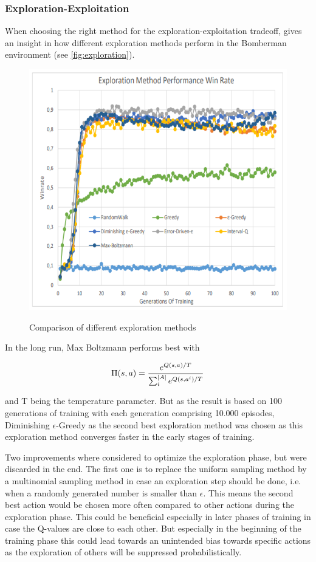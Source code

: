 \subsubsection{Exploration-Exploitation}
\label{ch:approachBa}

When choosing the right method for the exploration-exploitation tradeoff, \cite{Kormelink2018} gives an insight in how different exploration methods perform in the Bomberman environment (see \autoref{fig:exploration}). 

\begin{figure}[ht]
	\centering
	\includegraphics[width=0.6\linewidth]{figures/exploration.PNG}
	\caption{Comparison of different exploration methods}
	\label{fig:exploration}
	\cite{Kormelink2018}
\end{figure}

In the long run, Max Boltzmann performs best with 

\begin{equation}
	\Pi(s,a) = \frac{e^{Q(s,a)/T}}{\sum_i^{\lvert A\rvert}e^{Q(s,a^i)/T}}
\end{equation}

and T being the temperature parameter. But as the result is based on 100 generations of training with each generation comprising 10.000 episodes, Diminishing $\epsilon$-Greedy as the second best exploration method was chosen as this exploration method converges faster in the early stages of training.

Two improvements where considered to optimize the exploration phase, but were discarded in the end. The first one is to replace the uniform sampling method by a multinomial sampling method in case an exploration step should be done, i.e. when a randomly generated number is smaller than $\epsilon$. This means the second best action would be chosen more often compared to other actions during the exploration phase. This could be beneficial especially in later phases of training in case the Q-values are close to each other. But especially in the beginning of the training phase this could lead towards an unintended bias towards specific actions as the exploration of others will be suppressed probabilistically.

